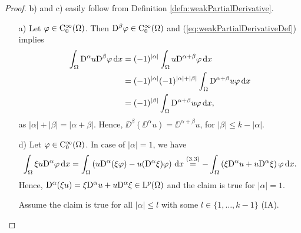 \begin{proof}
  b) and c) easily follow from Definition \ref{defn:weakPartialDerivative}.

  \begin{enumerate}
  \item[a)] Let $\varphi \in \mathrm{C}_0^\infty(\Omega)$. 
    Then $\mathrm{D}^\beta \varphi \in \mathrm{C}_0^\infty(\Omega)$ and (\ref{eq:weakPartialDerivativeDef}) implies
  \begin{align*}
    \int_\Omega \mathrm{D}^\alpha u \mathrm{D}^\beta \varphi \, {\operatorname{d}\!{x}}
    &= (-1)^{|\alpha|} \int_\Omega u \mathrm{D}^{\alpha + \beta} \varphi \, {\operatorname{d}\!{x}} \\
    &= (-1)^{|\alpha|} (-1)^{|\alpha| + |\beta|} \int_\Omega \mathrm{D}^{\alpha + \beta} u \varphi \, {\operatorname{d}\!{x}} \\
    &= (-1)^{|\beta|} \int_\Omega \mathrm{D}^{\alpha + \beta} u \varphi \, {\operatorname{d}\!{x}},
  \end{align*}
  as $|\alpha| + |\beta| = |\alpha + \beta|$.
      Hence, $\DD^\beta(\DD^\alpha u) = \DD^{\alpha + \beta} u$, for $|\beta| \leq k - |\alpha|$.

    \item[d)] Let $\varphi \in \mathrm{C}_0^\infty(\Omega)$. 
      In case of $|\alpha| = 1$, we have
      $$
      \int_\Omega \xi u \mathrm{D}^\alpha \varphi \, {\operatorname{d}\!{x}} = \int_\Omega \left( u \mathrm{D}^\alpha(\xi \varphi) - u(\mathrm{D}^\alpha \xi) \varphi \right) \, {\operatorname{d}\!{x}} \overset{(3.3)}{=} -\int_\Omega \left( \xi \mathrm{D}^\alpha u + u \mathrm{D}^\alpha \xi \right) \varphi \, {\operatorname{d}\!{x}}.
      $$
      Hence, $\mathrm{D}^\alpha(\xi u) = \xi \mathrm{D}^\alpha u + u \mathrm{D}^\alpha \xi \in \mathrm{L}^p(\Omega)$ and the claim is true for $|\alpha| = 1$.

      Assume the claim is true for all $|\alpha| \leq l$ with some $l \in \{1,\dots,k-1\}$ (IA).


\end{enumerate}
\end{proof}
